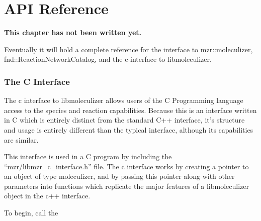 \chapter {API Reference}
\label{chap:apiReference}

\bf{This chapter has not been written yet.}

Eventually it will hold a complete reference for the interface to
mzr::moleculizer, fnd::ReactionNetworkCatalog, and the c-interface to
libmoleculizer.



\subsection{The C Interface}
The c interface to libmoleculizer allows users of the C Programming
language access to the species and reaction capabilities.  Because
this is an interface written in C which is entirely distinct from the
standard C++ interface, it's structure and usage is entirely different
than the typical interface, although its capabilities are similar.  

This interface is used in a C program by including the
``mzr/libmzr_c_interface.h'' file.  The c interface works by creating
a pointer to an object of type moleculizer, and by passing this
pointer along with other parameters into functions which replicate the
major features of a libmoleculizer object in the c++ interface.

To begin, call the 
